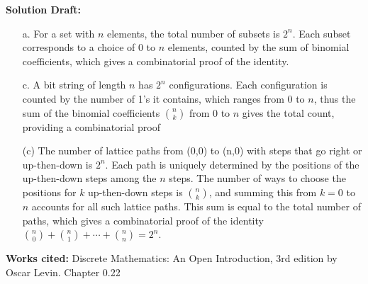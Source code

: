 \documentclass{article}
\begin{document}
\vspace{0.5cm}
\noindent\textbf{Solution Draft:} 
\vspace{0.2cm}

\begin{enumerate}
    \item[a.] For a set with \( n \) elements, the total number of subsets is \( 2^n \). Each subset corresponds to a choice of 0 to \( n \) elements, counted by the sum of binomial coefficients, which gives a combinatorial proof of the identity.
    \item[c.] A bit string of length \( n \) has \( 2^n \) configurations. Each configuration is counted by the number of 1's it contains, which ranges from 0 to \( n \), thus the sum of the binomial coefficients \( \binom{n}{k} \) from 0 to \( n \) gives the total count, providing a combinatorial proof
    \item[(c)] The number of lattice paths from (0,0) to (n,0) with steps that go right or up-then-down is \( 2^n \). Each path is uniquely determined by the positions of the up-then-down steps among the \( n \) steps. The number of ways to choose the positions for \( k \) up-then-down steps is \( \binom{n}{k} \), and summing this from \( k = 0 \) to \( n \) accounts for all such lattice paths. This sum is equal to the total number of paths, which gives a combinatorial proof of the identity \( \binom{n}{0} + \binom{n}{1} + \cdots + \binom{n}{n} = 2^n \).
\end{enumerate}
\vspace{0.5cm}
\textbf{Works cited:}
Discrete Mathematics: An Open Introduction, 3rd edition by Oscar Levin. Chapter 0.22
\end{document}

